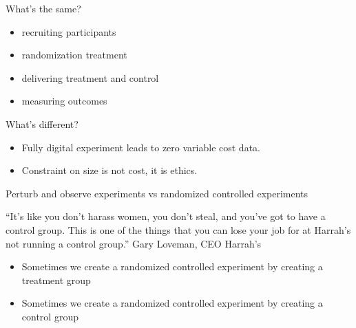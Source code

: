 \documentclass[aspectratio=169]{beamer}
\def\vf{\vfill}
\begin{document}
\begin{frame}

What's the same?
\begin{itemize}
\item recruiting participants
\item randomization treatment
\item delivering treatment and control
\item measuring outcomes
\end{itemize}

\pause 
\vf

What's different?
\begin{itemize}
\item Fully digital experiment leads to zero variable cost data.
\pause
\item Constraint on size is not cost, it is ethics.
\end{itemize}

\end{frame}
\begin{frame}

Perturb and observe experiments vs randomized controlled experiments

\end{frame}
\begin{frame}

``It's like you don't harass women, you don't steal, and you've got to have a control group. This is one of the things that you can lose your job for at Harrah's not running a control group.''
Gary Loveman, CEO Harrah's

\end{frame}
\begin{frame}

\begin{itemize}
\item Sometimes we create a randomized controlled experiment by creating a treatment group 
\item Sometimes we create a randomized controlled experiment by creating a control group
\end{itemize}

\end{frame}
\end{document}
